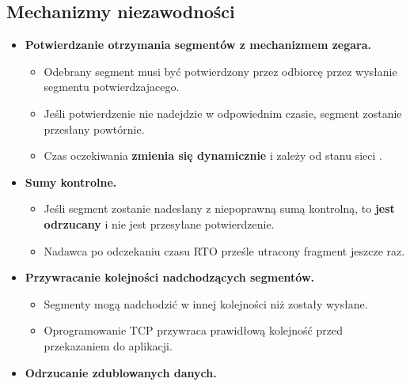 \documentclass[../sk-egzamin.tex]{subfiles}
\begin{document}

\subsection*{Mechanizmy niezawodności}
\begin{itemize}
    \item \textbf{Potwierdzanie otrzymania segmentów z mechanizmem zegara.}
    \begin{itemize}
        \item Odebrany segment musi być potwierdzony przez odbiorcę przez
        wysłanie segmentu potwierdzajacego.

        \item Jeśli potwierdzenie nie nadejdzie w odpowiednim czasie,
        segment zostanie przesłany powtórnie.

        \item Czas oczekiwania \textbf{zmienia się dynamicznie} i zależy od
        stanu sieci .
    \end{itemize}

    \item \textbf{Sumy kontrolne.}
    \begin{itemize}
        \item Jeśli segment zostanie nadesłany z niepoprawną sumą kontrolną,
        to \textbf{jest odrzucany} i nie jest przesyłane potwierdzenie.

        \item Nadawca po odczekaniu czasu RTO 
        prześle utracony fragment jeszcze raz.
    \end{itemize}

    \item \textbf{Przywracanie kolejności nadchodzących segmentów.}
    \begin{itemize}
        \item Segmenty mogą nadchodzić w innej kolejności niż zostały wysłane.

        \item Oprogramowanie TCP przywraca prawidłową kolejność przed
        przekazaniem do aplikacji.
    \end{itemize}

    \item \textbf{Odrzucanie zdublowanych danych.}
\end{itemize}

\pagebreak
\end{document}
